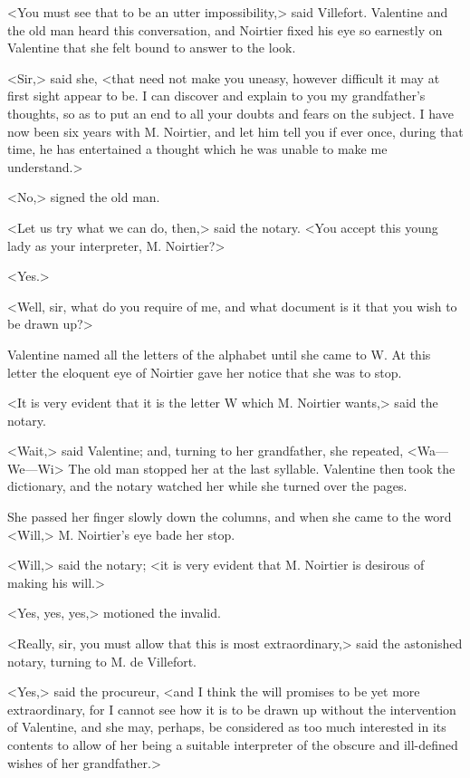  <You must see that to be an utter impossibility,> said Villefort. Valentine and the old man heard this conversation, and Noirtier fixed his eye so earnestly on Valentine that she felt bound to answer to the look. 

 <Sir,> said she, <that need not make you uneasy, however difficult it may at first sight appear to be. I can discover and explain to you my grandfather's thoughts, so as to put an end to all your doubts and fears on the subject. I have now been six years with M. Noirtier, and let him tell you if ever once, during that time, he has entertained a thought which he was unable to make me understand.> 

 <No,> signed the old man. 

 <Let us try what we can do, then,> said the notary. <You accept this young lady as your interpreter, M. Noirtier?> 

 <Yes.> 

 <Well, sir, what do you require of me, and what document is it that you wish to be drawn up?> 

 Valentine named all the letters of the alphabet until she came to W. At this letter the eloquent eye of Noirtier gave her notice that she was to stop. 

 <It is very evident that it is the letter W which M. Noirtier wants,> said the notary. 

 <Wait,> said Valentine; and, turning to her grandfather, she repeated, <Wa—We—Wi\longdash> The old man stopped her at the last syllable. Valentine then took the dictionary, and the notary watched her while she turned over the pages. 

 She passed her finger slowly down the columns, and when she came to the word <Will,> M. Noirtier's eye bade her stop. 

 <Will,> said the notary; <it is very evident that M. Noirtier is desirous of making his will.> 

 <Yes, yes, yes,> motioned the invalid. 

 <Really, sir, you must allow that this is most extraordinary,> said the astonished notary, turning to M. de Villefort. 

 <Yes,> said the procureur, <and I think the will promises to be yet more extraordinary, for I cannot see how it is to be drawn up without the intervention of Valentine, and she may, perhaps, be considered as too much interested in its contents to allow of her being a suitable interpreter of the obscure and ill-defined wishes of her grandfather.> 

